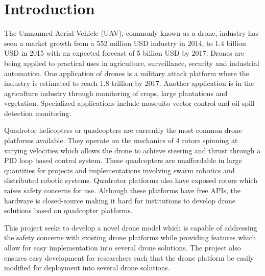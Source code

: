 \documentclass[12pt]{article}
\begin{document}
\newpage

\section{Introduction}

The Unmanned Aerial Vehicle (UAV), commonly known as a drone, industry has seen a market growth from a 552 million USD industry in 2014, to 1.4 billion USD in 2015 with an expected forecast of 5 billion USD by 2017\cite{legalandsocial}. Drones are being applied to practical uses in agriculture, surveillance, security and industrial automation. One application of drones is a military attack platform where the industry is estimated to reach 1.8 trillion by 2017\cite{dronewars}. Another application is in the agriculture industry through monitoring of crops, large plantations and vegetation\cite{agriculture}. Specialized applications include mosquito vector control\cite{mosquito} and oil spill detection monitoring\cite{oilspill}. 

Quadrotor helicopters or quadcopters are currently the most common drone platforms available. They operate on the mechanics of 4 rotors spinning at varying velocities which allows the drone to achieve steering and thrust through a PID loop based control system\cite{Multiwii}. These quadcopters are unaffordable in large quantities for projects and implementations involving swarm robotics and distributed robotic systems. Quadrotor platforms also have exposed rotors which raises safety concerns for use. Although these platforms have free APIs, the hardware is closed-source making it hard for institutions to develop drone solutions based on quadcopter platforms.

This project seeks to develop a novel drone model which is capable of addressing the safety concerns with existing drone platforms while providing features which allow for easy implementation into several drone solutions. The project also ensures easy development for researchers such that the drone platform be easily modified for deployment into several drone solutions.
\end{document}
